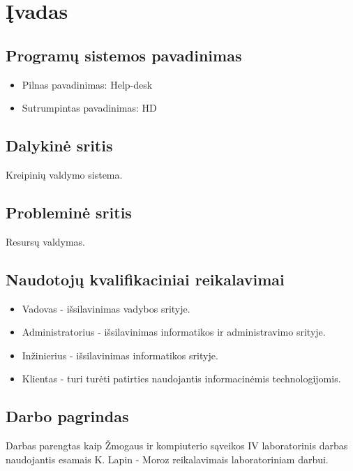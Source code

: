 \section{Įvadas}
	
	\subsection{Programų sistemos pavadinimas}
	
	\begin{itemize}
	\item Pilnas pavadinimas: Help-desk
	\item Sutrumpintas pavadinimas: HD
	\end{itemize}
	
	\subsection{Dalykinė sritis}
	
	Kreipinių valdymo sistema.
	
	\subsection{Probleminė sritis}
	
	Resursų valdymas.
	
	\subsection{Naudotojų kvalifikaciniai reikalavimai}
	
	\begin{itemize}
	\item Vadovas - išsilavinimas vadybos srityje.
	\item Administratorius - išsilavinimas informatikos ir administravimo srityje.
	\item Inžinierius - išsilavinimas informatikos srityje.
	\item Klientas - turi turėti patirties naudojantis informacinėmis technologijomis.
	\end{itemize}
	
	\subsection{Darbo pagrindas}
	
	Darbas parengtas kaip Žmogaus ir kompiuterio sąveikos IV laboratorinis darbas naudojantis esamais K. Lapin - Moroz reikalavimais laboratoriniam darbui.
	
